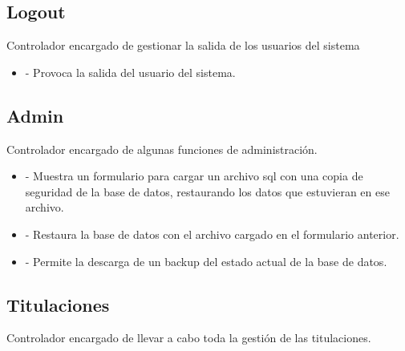 \subsection{Logout}

Controlador encargado de gestionar la salida de los usuarios del sistema

\begin{itemize}
\item {} - Provoca la salida del usuario del sistema.
\end{itemize}

\subsection{Admin}

Controlador encargado de algunas funciones de administración.

\begin{itemize}
\item {} - Muestra un formulario para cargar un archivo sql con una copia de seguridad de la base de datos, restaurando los datos que estuvieran en ese archivo.
\item {} - Restaura la base de datos con el archivo cargado en el formulario anterior.
\item {} - Permite la descarga de un backup del estado actual de la base de datos.
\end{itemize}

\subsection{Titulaciones}
Controlador encargado de llevar a cabo toda la gestión de las titulaciones.

